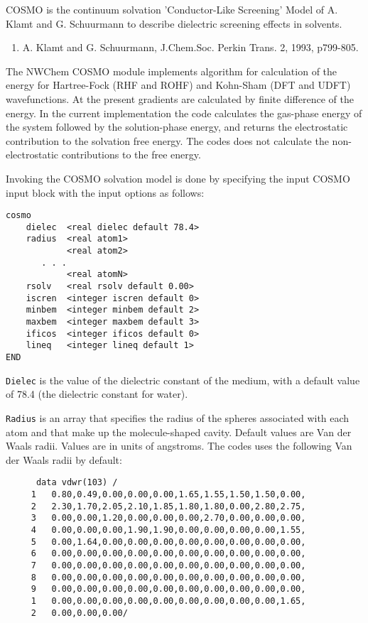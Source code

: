 \label{sec:cosmo}

COSMO is the continuum solvation 'Conductor-Like Screening' Model 
of A. Klamt and G. Schuurmann to describe dielectric screening
effects in solvents.

\begin{enumerate}
\item A. Klamt and G. Schuurmann, J.Chem.Soc. Perkin Trans. 2, 1993,
p799-805.
\end{enumerate}

The NWChem COSMO module implements algorithm for calculation of the
energy for Hartree-Fock (RHF and ROHF) and Kohn-Sham (DFT and UDFT)
wavefunctions. At the present gradients are calculated by finite
difference of the energy. In the current implementation the code
calculates the gas-phase energy of the system followed by the
solution-phase energy, and returns the electrostatic contribution
to the solvation free energy. The codes does not calculate the
non-electrostatic contributions to the free energy.

Invoking the COSMO solvation model is done by specifying the input
COSMO input block with the input options as follows:

\begin{verbatim}
cosmo
    dielec  <real dielec default 78.4>
    radius  <real atom1>
            <real atom2>
       . . .
            <real atomN>
    rsolv   <real rsolv default 0.00>
    iscren  <integer iscren default 0>
    minbem  <integer minbem default 2>
    maxbem  <integer maxbem default 3>
    ificos  <integer ificos default 0>
    lineq   <integer lineq default 1>
END
\end{verbatim}

\verb+Dielec+ is the value of the dielectric constant of the medium, 
with a default value of 78.4 (the dielectric constant for water).

\verb+Radius+ is an array that specifies the radius of the spheres
associated with each atom and that make up the molecule-shaped cavity.
Default values are Van der Waals radii. Values are in units of angstroms.
The codes uses the following Van der Waals radii by default:

\begin{verbatim}
      data vdwr(103) /
     1   0.80,0.49,0.00,0.00,0.00,1.65,1.55,1.50,1.50,0.00,
     2   2.30,1.70,2.05,2.10,1.85,1.80,1.80,0.00,2.80,2.75,
     3   0.00,0.00,1.20,0.00,0.00,0.00,2.70,0.00,0.00,0.00,
     4   0.00,0.00,0.00,1.90,1.90,0.00,0.00,0.00,0.00,1.55,
     5   0.00,1.64,0.00,0.00,0.00,0.00,0.00,0.00,0.00,0.00,
     6   0.00,0.00,0.00,0.00,0.00,0.00,0.00,0.00,0.00,0.00,
     7   0.00,0.00,0.00,0.00,0.00,0.00,0.00,0.00,0.00,0.00,
     8   0.00,0.00,0.00,0.00,0.00,0.00,0.00,0.00,0.00,0.00,
     9   0.00,0.00,0.00,0.00,0.00,0.00,0.00,0.00,0.00,0.00,
     1   0.00,0.00,0.00,0.00,0.00,0.00,0.00,0.00,0.00,1.65,
     2   0.00,0.00,0.00/
\end{verbatim}

